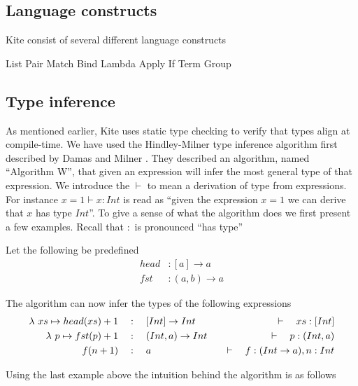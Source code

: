 \subsection{Language constructs}

Kite consist of several different language constructs

List
Pair
Match
Bind
Lambda
Apply
If
Term
Group

\subsection{Type inference}
As mentioned earlier, Kite uses static type checking to verify that types align at compile-time. We have used the Hindley-Milner type inference algorithm first described by Damas and Milner \cite{milner82}. They described an algorithm, named ``Algorithm W'', that given an expression will infer the most general type of that expression. We introduce the $\vdash$ to mean a derivation of type from expressions. For instance $x = 1 \vdash x : Int$ is read as ``given the expression $x = 1$ we can derive that $x$ has type $Int$''. To give a sense of what the algorithm does we first present a few examples. Recall that $:$ is pronounced ``has type''

Let the following be predefined
\begin{align*}
  head   & : [a] \to a   \\
  fst    & : (a, b) \to a
\end{align*}

The algorithm can now infer the types of the following expressions
\begin{align*}
  \lambda{} \ xs \mapsto{} head(xs) + 1 & \quad:\quad [Int] \to Int    & \quad\vdash\quad xs : [Int]             \\
  \lambda{} \ p \mapsto{} fst(p) + 1    & \quad:\quad (Int, a) \to Int & \quad\vdash\quad p : (Int, a)           \\
  f(n + 1)              & \quad:\quad a                & \quad\vdash\quad f: (Int \to a), n: Int \\
\end{align*}

Using the last example above the intuition behind the algorithm is as follows


